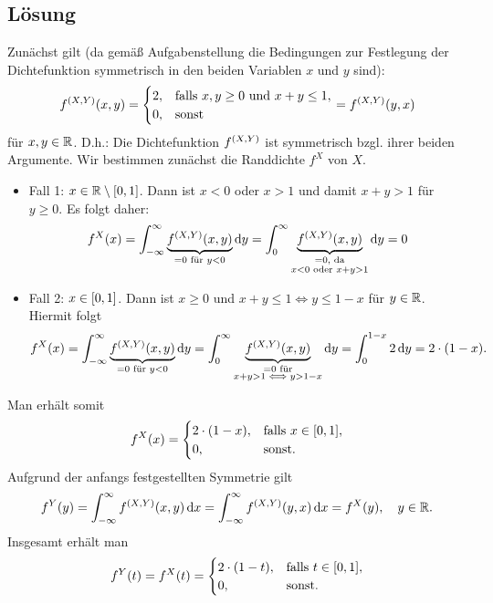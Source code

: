 \documentclass{exercise}
\begin{document}
    \subsection*{Lösung}
    Zunächst gilt (da gemäß Aufgabenstellung die Bedingungen zur Festlegung der Dichtefunktion symmetrisch in den beiden Variablen \(x\) und \(y\) sind):
    \[
        f^{\parentheses*{X, Y}}\parentheses*{x, y} = \begin{cases}
            2, & \text{falls }x, y \ge 0\text{ und }x + y \le 1,\\
            0, & \text{sonst}
        \end{cases} = f^{\parentheses*{X, Y}}\parentheses*{y, x}
    \]
    für \(x, y \in \R\).
    D.h.: Die Dichtefunktion \(f^{\parentheses*{X, Y}}\) ist symmetrisch bzgl. ihrer beiden Argumente.
    Wir bestimmen zunächst die Randdichte \(f^X\) von \(X\).
    \begin{itemize}
        \item Fall 1: \(x \in \R \setminus \brackets*{0, 1}\).
        Dann ist \(x < 0\) oder \(x > 1\) und damit \(x + y > 1\) für \(y \ge 0\).
        Es folgt daher:
        \[
            f^X\parentheses*{x} = \int_{-\infty}^\infty \underbrace{f^{\parentheses*{X, Y}}\parentheses*{x, y}}_{= 0\text{ für }y < 0}\d y = \int_0^\infty\underbrace{f^{\parentheses*{X, Y}}\parentheses*{x, y}}_{\substack{= 0\text{, da}\\x < 0\text{ oder }x + y > 1}}\d y = 0
        \]
        \item Fall 2: \(x \in \brackets*{0, 1}\).
        Dann ist \(x \ge 0\) und \(x + y \le 1 \iff y \le 1 - x\) für \(y \in \R\).
        Hiermit folgt
        \[
            f^X\parentheses*{x} = \int_{-\infty}^\infty \underbrace{f^{\parentheses*{X, Y}}\parentheses*{x, y}}_{= 0\text{ für }y < 0}\d y = \int_0^\infty \underbrace{f^{\parentheses*{X, Y}}\parentheses*{x, y}}_{\substack{= 0\text{ für}\\x + y > 1 \iff y > 1 - x}}\d y = \int_0^{1 - x}2\d y = 2 \cdot \parentheses*{1 - x}.
        \]
    \end{itemize}
    Man erhält somit
    \[
        f^X\parentheses*{x} = \begin{cases}
            2 \cdot \parentheses*{1 - x}, & \text{falls }x \in \brackets*{0, 1},\\
            0, & \text{sonst}.
        \end{cases}
    \]
    Aufgrund der anfangs festgestellten Symmetrie gilt
    \[
        f^Y\parentheses*{y} = \int_{-\infty}^\infty f^{\parentheses*{X, Y}}\parentheses*{x, y}\d x = \int_{-\infty}^\infty f^{\parentheses*{X, Y}}\parentheses*{y, x}\d x = f^X\parentheses*{y}, \quad y \in \R.
    \]
    Insgesamt erhält man
    \[
        f^Y\parentheses*{t} = f^X\parentheses*{t} = \begin{cases}
            2 \cdot \parentheses*{1 - t}, & \text{falls }t \in \brackets*{0, 1},\\
            0, & \text{sonst}.
        \end{cases}
    \]
    
\end{document}

